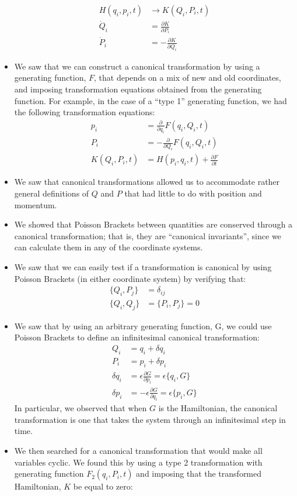 \documentclass[10pt]{report}
\newcommand{\die}[2]{\frac{\partial #1}{\partial #2}}
\begin{document}
\begin{itemize}
\begin{align*}
H(q_i,p_i,t)&\to K(Q_i,P_i,t)\nonumber\\
\dot Q_i&=\die{K}{P_i}\nonumber\\
\dot P_i&=-\die{K}{Q_i}
\end{align*}
\item We saw that we can construct a canonical transformation by using a generating function, $F$, that depends on a mix of new and old coordinates, and imposing transformation equations obtained from the generating function. For example, in the case of a ``type 1'' generating function, we had the following transformation equations:
\begin{align*}
p_i&=\die{}{q_i}F(q_i,Q_i,t)\nonumber\\
P_i&=-\die{}{Q_i}F(q_i,Q_i,t)\nonumber\\
K(Q_i,P_i,t)&=H(p_i,q_i,t)+\die{F}{t}
\end{align*}
\item We saw that canonical transformations allowed us to accommodate rather general definitions of $Q$ and $P$ that had little to do with position and momentum.
\item We showed that Poisson Brackets between quantities are conserved through a canonical transformation; that is, they are ``canonical invariants'', since we can calculate them in any of the coordinate systems.
\item We saw that we can easily test if a transformation is canonical by using Poisson Brackets (in either coordinate system) by verifying that:
\begin{align*}
\{Q_i,P_j\}&=\delta_{ij}\\
\{Q_i,Q_j\}&=\{P_i,P_j\}=0
\end{align*}
\item We saw that by using an arbitrary generating function, G, we could use Poisson Brackets to define an infinitesimal canonical transformation:
\begin{align*}
Q_i&=q_i+\delta q_i\\
P_i&=p_i+\delta p_i\\
\delta q_i&=\epsilon\die{G}{p_i}=\epsilon\{q_i,G\}\nonumber\\
\delta p_i&=-\epsilon\die{G}{q_i}=\epsilon\{p_i,G\}
\end{align*}
In particular, we observed that when $G$ is the Hamiltonian, the canonical transformation is one that takes the system through an infinitesimal step in time.
\item We then searched for a canonical transformation that would make all variables cyclic. We found this by using a type 2 transformation with generating function $F_2(q_i, P_i, t)$ and imposing that the transformed Hamiltonian, $K$ be equal to zero:

\end{itemize}
\end{document}
